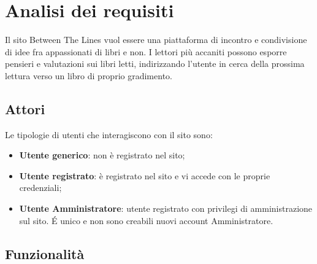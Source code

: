 \documentclass[12pt,a4paper,headings=optiontohead]{article}
\begin{document}
	\tableofcontents
	\newpage
	\section{Analisi dei requisiti}
	
	Il sito Between The Lines vuol essere una piattaforma di incontro e condivisione di idee fra appassionati di libri e non. I lettori più accaniti possono esporre pensieri e valutazioni sui libri letti, indirizzando l'utente in cerca della prossima lettura verso un libro di proprio gradimento.
	
	
	\subsection{Attori}
	
	Le tipologie di utenti che interagiscono con il sito sono:
	\begin{itemize}
		\item \textbf{Utente generico}: non è registrato nel sito;
		\item \textbf{Utente registrato}: è registrato nel sito e vi accede con le proprie credenziali;
		\item \textbf{Utente Amministratore}: utente registrato con privilegi di amministrazione sul sito. \'E unico e non sono creabili nuovi account Amministratore. 
	\end{itemize} 
	
	
	\subsection{Funzionalità}
	
\end{document}
